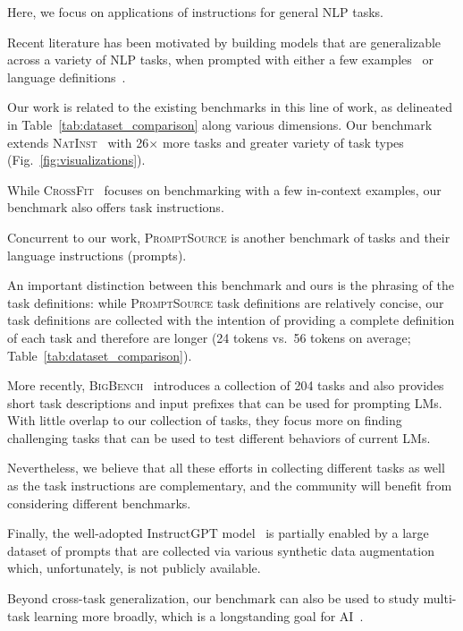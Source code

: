 Here, we focus on applications of instructions for general NLP tasks. 

Recent literature has been motivated by building models that are generalizable across a variety of NLP tasks, when prompted with either a few examples~\cite{ye2021learning,bragg2021flex} or language definitions~\cite{efrat2020turking,weller2020learning,zhong2021adapting,mishra2022cross,mishra2022reframing,parmar-etal-2022-boxbart}. 

Our work is related to the existing benchmarks in this line of work, as delineated in Table~\ref{tab:dataset_comparison} along various dimensions. Our benchmark  extends \textsc{NatInst}~\cite{mishra2022cross} with  26$\times$  more tasks and greater variety of task types (Fig.~\ref{fig:visualizations}). 

While \textsc{CrossFit}~\cite{ye2021crossfit} focuses on benchmarking with a few in-context examples, our benchmark also offers task instructions. 

Concurrent to our work, \textsc{PromptSource} \cite{bach2022promptsource} is another benchmark of tasks and their language instructions (prompts).

An important distinction between this benchmark and ours is the phrasing of the task definitions: while \textsc{PromptSource} task definitions are relatively concise, our task definitions are collected with the intention of providing a complete definition of each task and therefore are longer (24 tokens vs.~56 tokens on average; Table~\ref{tab:dataset_comparison}). 

More recently, \textsc{BigBench}~\cite{srivastava2022beyond} introduces a collection of 204 tasks and also provides short task descriptions and input prefixes that can be used for prompting LMs. With little overlap to our collection of tasks, they focus more on finding challenging tasks that can be used to test different behaviors of current LMs.

Nevertheless, we believe that all these efforts in collecting different tasks as well as the task instructions are complementary, and the community will benefit from considering different benchmarks.

Finally, the well-adopted InstructGPT model~\cite{ouyang2022training} is partially enabled by a large dataset of prompts that are collected via various synthetic data augmentation which, unfortunately, is not publicly available. 

Beyond cross-task generalization, our benchmark can also be used to study multi-task learning more broadly, which is a longstanding goal for AI~\cite{caruana1997multitask}.

